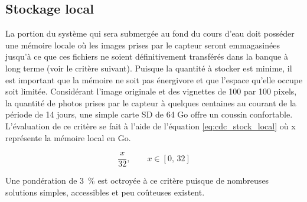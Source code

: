 

\subsection{Stockage local}
\label{s:cdc_stock_local}

La portion du système qui sera submergée au fond du cours d’eau doit posséder une mémoire locale où les images prises par le capteur seront emmagasinées jusqu’à ce que ces fichiers ne soient définitivement transférés dans la banque à long terme (voir le critère suivant). Puisque la quantité à stocker est minime, il est important que la mémoire ne soit pas énergivore et que l’espace qu’elle occupe soit limitée. Considérant l'image originale et des vignettes de 100 par 100 pixels, la quantité de photos prises par le capteur à quelques centaines au courant de la période de 14 jours, une simple carte SD de 64 Go offre un coussin confortable. L’évaluation de ce critère se fait à l’aide de l'équation \ref{eq:cdc_stock_local} où x représente la mémoire local en Go. 

\begin{equation} \label{eq:cdc_stock_local}
	\frac{x}{32}, \qquad x \in [0,\,32]
\end{equation}

Une pondération de 3~\% est octroyée à ce critère puisque de nombreuses solutions simples, accessibles et peu coûteuses existent. 
